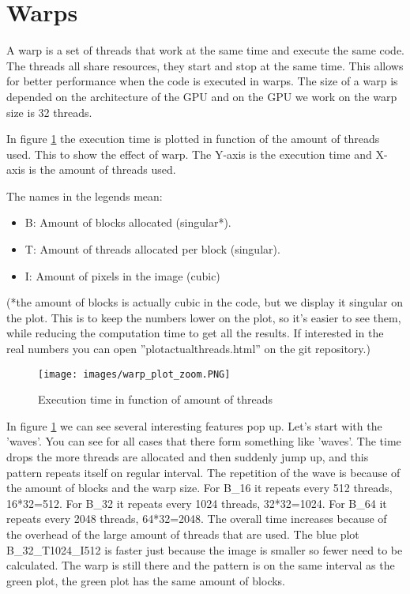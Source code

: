 \newpage

\section{Warps}
\label{sec:warps}

A warp is a set of threads that work at the same time and execute the same code. The threads all share resources, they start and stop at the same time. This allows for better performance when the code is executed in warps. The size of a warp is depended on the architecture of the GPU and on the GPU we work on the warp size is 32 threads.

In figure \ref{figure:warp_zoom} the execution time is plotted in function of the amount of threads used. This to show the effect of warp. The Y-axis is the execution time and X-axis is the amount of threads used.

The names in the legends mean:
\begin{itemize}
    \item B: Amount of blocks allocated (singular*).
    \item T: Amount of threads allocated per block (singular).\
    \item I: Amount of pixels in the image (cubic)
\end{itemize}
(*the amount of blocks is actually cubic in the code, but we display it singular on the plot. This is to keep the numbers lower on the plot, so it's easier to see them, while reducing the computation time to get all the results. If interested in the real numbers you can open ''plotactualthreads.html'' on the git repository.)

\begin{figure}[H]
    \centering
    \texttt{[image: images/warp\_plot\_zoom.PNG]}
    \caption{Execution time in function of amount of threads}
    \label{figure:warp_zoom}
\end{figure}

In figure \ref{figure:warp_zoom} we can see several interesting features pop up. Let's start with the 'waves'. You can see for all cases that there form something like 'waves'. The time drops the more threads are allocated and then suddenly jump up, and this pattern repeats itself on regular interval. 
The repetition of the wave is because of the amount of blocks and the warp size. For B\_16 it repeats every 512 threads, 16*32=512. For B\_32 it repeats every 1024 threads, 32*32=1024. For B\_64 it repeats every 2048 threads, 64*32=2048. 
The overall time increases because of the overhead of the large amount of threads that are used.
The blue plot B\_32\_T1024\_I512 is faster just because the image is smaller so fewer need to be calculated. The warp is still there and the pattern is on the same interval as the green plot, the green plot has the same amount of blocks.


